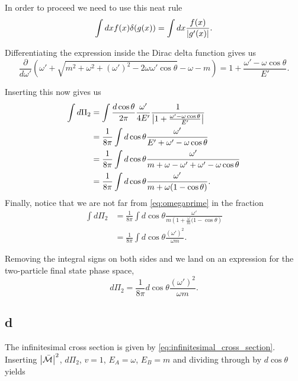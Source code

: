 \documentclass[11pt, a4paper]{amsart}
\begin{document}
In order to proceed we need to use this neat rule
\begin{equation}
\int dx f(x) \delta(g(x)) = \int dx \frac{f(x)}{\abs{g'(x)}}.
\end{equation}

Differentiating the expression inside the Dirac delta function gives us
\begin{equation}
\frac{\partial}{d\omega'} \left(\omega' + \sqrt{m^2 + \omega^2 + (\omega')^2 - 2\omega\omega'\cos\theta} - \omega -m \right)
= 1 + \frac{\omega' - \omega\cos\theta}{E'}.
\end{equation}

Inserting this now gives us
\begin{align}
\int d\Pi_2 &= \int \frac{d\cos\theta}{2\pi} \frac{\omega'}{4E'} \frac{1}{\abs{1 + \frac{\omega' - \omega\cos\theta}{E'}}} \\
			&= \frac{1}{8\pi} \int d\cos \theta \frac{\omega'}{E' + \omega' - \omega\cos\theta} \\
			&= \frac{1}{8\pi} \int d\cos \theta \frac{\omega'}{m + \omega - \omega' + \omega' - \omega\cos\theta} \\
			&= \frac{1}{8\pi} \int d\cos \theta \frac{\omega'}{m + \omega(1 - \cos\theta)}.
\end{align}
Finally, notice that we are not far from \autoref{eq:omegaprime} in the fraction
\begin{align}
\int d\Pi_2 &= \frac{1}{8\pi} \int d\cos \theta \frac{\omega'}{m\left(1 + \frac{\omega}{m}(1 - \cos\theta\right)} \\
 			&= \frac{1}{8\pi} \int d\cos \theta \frac{(\omega')^2}{\omega m}.
\end{align}

Removing the integral signs on both sides and we land on an expression for the two-particle final state phase space,
\begin{equation}
d\Pi_2 = \frac{1}{8\pi} d\cos \theta \frac{(\omega')^2}{\omega m}.
\end{equation}

\subsection{d}
The infinitesimal cross section is given by \autoref{eq:infinitesimal_cross_section}. Inserting $\abs{\bar{\mathcal{M}}}^2$, $d\Pi_2$, $v= 1$, $E_A = \omega$, $E_B = m$ and dividing through by $d\cos\theta$ yields
\end{document}
